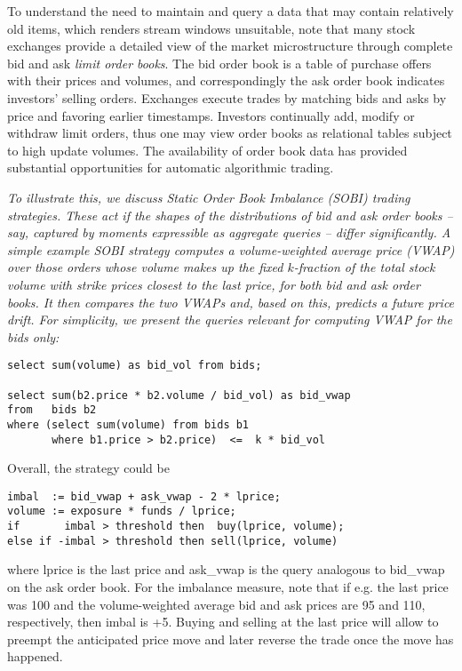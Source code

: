 To understand the need to maintain and query a data that may contain relatively old items, which renders stream windows unsuitable, note that
many stock exchanges provide a detailed view of the market microstructure
through complete bid and ask {\em limit order books}. The bid order book is a
table of purchase offers with their prices and volumes, and correspondingly the
ask order book indicates investors' selling orders. Exchanges execute trades by
matching bids and asks by price and favoring earlier timestamps. Investors
continually add, modify or withdraw limit orders, thus one may view order books
as relational tables subject to high update volumes. The availability of order
book data has provided substantial opportunities for automatic algorithmic
trading.



\begin{example}\em
To illustrate this, we discuss Static Order Book Imbalance (SOBI) trading
strategies. These act if the shapes of the distributions of bid and ask
order books -- say, captured by moments expressible as aggregate queries --
differ significantly. A simple example SOBI strategy \cite{sobi-kearns}
computes a volume-weighted average price (VWAP) over those
orders whose volume makes up the fixed $k$-fraction of the total stock volume
with strike prices closest to the last price, for both
bid and ask order books. It then compares the two VWAPs and, based on
this, predicts a future price drift.
For simplicity, we present the queries relevant for computing
VWAP for the bids only:
\begin{verbatim}
select sum(volume) as bid_vol from bids;

select sum(b2.price * b2.volume / bid_vol) as bid_vwap
from   bids b2
where (select sum(volume) from bids b1
       where b1.price > b2.price)  <=  k * bid_vol
\end{verbatim}
Overall, the strategy could be
\begin{verbatim}
imbal  := bid_vwap + ask_vwap - 2 * lprice;
volume := exposure * funds / lprice;
if       imbal > threshold then  buy(lprice, volume);
else if -imbal > threshold then sell(lprice, volume)
\end{verbatim}
where lprice is the last price and
ask\_vwap is the query analogous to bid\_vwap
on the ask order book.
For the imbalance measure, note that if e.g. the last price was 100 and
the volume-weighted average bid and ask prices are 95 and 110, respectively,
then imbal is +5.
Buying and selling at the last price will allow to preempt the
anticipated price move and later reverse the trade once the
move has happened.


\end{example}

